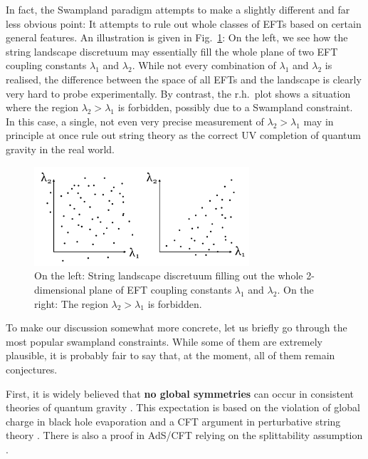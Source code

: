 \documentclass[12pt]{article}
\numberwithin{equation}{section}
\begin{document}
In fact, the Swampland paradigm attempts to make a slightly different and far less obvious point: It attempts to rule out whole classes of EFTs based on certain general features. An illustration is given in Fig.~\ref{lssw}: On the left, we see how the string landscape discretuum may essentially fill the whole plane of two EFT coupling constants $\lambda_1$ and $\lambda_2$. While not every combination of $\lambda_1$ and $\lambda_2$ is realised, the difference between the space of all EFTs and the landscape is clearly very hard to probe experimentally. By contrast, the r.h.~plot shows a situation where the region $\lambda_2>\lambda_1$ is forbidden, possibly due to a Swampland constraint. In this case, a single, not even very precise measurement of $\lambda_2>\lambda_1$ may in principle at once rule out string theory as the correct UV completion of quantum gravity in the real world.

\begin{figure}[ht]
\begin{center} 
\includegraphics[width=8cm]{lssw.png}
\caption{On the left: String landscape discretuum filling out the whole 2-dimensional plane of EFT coupling constants $\lambda_1$ and $\lambda_2$. On the right: The region $\lambda_2>\lambda_1$ is forbidden.}
\label{lssw} 
\end{center}
\end{figure}

To make our discussion somewhat more concrete, let us briefly go through the most popular swampland constraints. While some of them are extremely plausible, it is probably fair to say that, at the moment, all of them remain conjectures.

First, it is widely believed that {\bf no global symmetries} can occur in consistent theories of quantum gravity \cite{Banks:1988yz, Kamionkowski:1992mf, Holman:1992us, Kallosh:1995hi, Banks:2010zn, Harlow:2018tng}. This expectation is based on the violation of global charge in black hole evaporation and a CFT argument in perturbative string theory \cite{Banks:1988yz}. There is also a proof in AdS/CFT relying on the splittability assumption \cite{Harlow:2018tng}.
\end{document}

